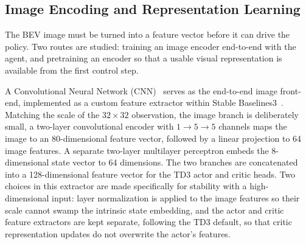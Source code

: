 \subsection{Image Encoding and Representation Learning}

The BEV image must be turned into a feature vector before it can drive the policy. Two routes are studied: training an image encoder end-to-end with the agent, and pretraining an encoder so that a usable visual representation is available from the first control step.

A Convolutional Neural Network (CNN)~\cite{lecun1998gradient} serves as the end-to-end image front-end, implemented as a custom feature extractor within Stable Baselines3~\cite{raffin2021sb3}. Matching the scale of the $32 \times 32$ observation, the image branch is deliberately small, a two-layer convolutional encoder with $1 \rightarrow 5 \rightarrow 5$ channels maps the image to an 80-dimensional feature vector, followed by a linear projection to 64 image features. A separate two-layer multilayer perceptron embeds the 8-dimensional state vector to 64 dimensions. The two branches are concatenated into a 128-dimensional feature vector for the TD3 actor and critic heads. Two choices in this extractor are made specifically for stability with a high-dimensional input: layer normalization is applied to the image features so their scale cannot swamp the intrinsic state embedding, and the actor and critic feature extractors are kept separate, following the TD3 default, so that critic representation updates do not overwrite the actor's features.

